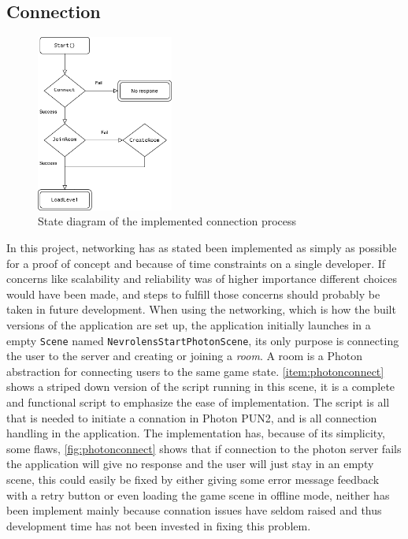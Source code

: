 \subsection*{Connection}

\begin{figure} 
    \centering
    \includegraphics[width=0.4\textwidth]{fig/photonconnectiondiagram2.png}
    \caption{State diagram of the implemented connection process}
    \vspace{30pt}
    \label{fig:photonconnect}
\end{figure}
In this project, networking has as stated been implemented as simply as possible for a proof of concept and because of time constraints on a single developer. If concerns like scalability and reliability was of higher importance different choices would have been made, and steps to fulfill those concerns should probably be taken in future development.
When using the networking, which is how the built versions of the application are set up, the application initially launches in a empty \texttt{Scene} named \texttt{NevrolensStartPhotonScene}, its only purpose is connecting the user to the server and creating or joining a \textit{room}. A room is a Photon abstraction for connecting users to the same game state. \autoref{item:photonconnect} shows a striped down version of the script running in this scene, it is a complete and functional script to emphasize the ease of implementation. The script  is all that is needed to initiate a connation in Photon PUN2, and is all connection handling in the application. The implementation has, because of its simplicity, some flaws, \autoref{fig:photonconnect} shows that if connection to the photon server fails the application will give no response and the user will just stay in an empty scene, this could easily be fixed by either giving some error message feedback with a retry button or even loading the game scene in offline mode, neither has been implement mainly because connation issues have seldom raised and thus development time has not been invested in fixing this problem. 

